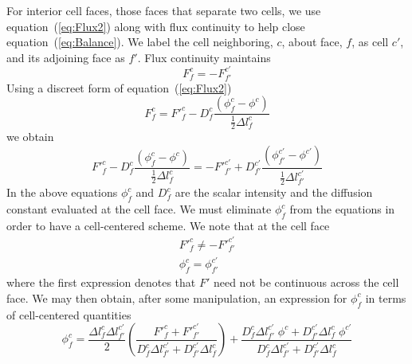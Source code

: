 \documentclass[12pt]{article}
\begin{document}
For interior cell faces, those faces that separate two cells, we use
equation~(\ref{eq:Flux2}) along with flux continuity to help close
equation~(\ref{eq:Balance}).
We label the cell neighboring, $c$, about face, $f$, as cell $c'$, and its
adjoining face as $f'$.
Flux continuity maintains
\begin{equation}
        F^{c}_{f} = - F^{c'}_{f'}
\end{equation}
Using a discreet form of equation~(\ref{eq:Flux2})
\begin{equation}
        F^{c}_{f} = 
        {F'}^{c}_{f} - D^{c}_{f} \frac{(\phi^{c}_{f} - \phi^{c})}
                                      {\frac{1}{2}\Delta l^{c}_{f}}
\label{eq:Flux3}
\end{equation}
we obtain
\begin{equation}
        {F'}^{c}_{f} - D^{c}_{f} \frac{(\phi^{c}_{f} - \phi^{c})}
                                    {\frac{1}{2}\Delta l^{c}_{f}}
    = - {F'}^{c'}_{f'} + D^{c'}_{f'} \frac{(\phi^{c'}_{f'} - \phi^{c'})}
                                        {\frac{1}{2}\Delta l^{c'}_{f'}}
\end{equation}
In the above equations $\phi^{c}_{f}$ and $D^{c}_{f}$
are the scalar intensity and the diffusion constant evaluated
at the cell face.
We must eliminate $\phi^{c}_{f}$ from the equations in order to have a
cell-centered scheme.
We note that at the cell face
\begin{gather}
        {F'}^{c}_{f} \ne - {F'}^{c'}_{f'} \\
        \phi^{c}_{f} = \phi^{c'}_{f'}
\end{gather}
where the first expression denotes that $F'$ need not be continuous across
the cell face.
We may then obtain, after some manipulation,
an expression for $\phi^{c}_{f}$ in terms of cell-centered
quantities
\begin{equation}
        \phi^{c}_{f} =  \frac{\Delta l^{c}_{f} \Delta l^{c'}_{f'}}{2}
                        \left(
                        \frac
                        {  {F'}^{c}_{f} + {F'}^{c'}_{f'}
                        }
                        { D^{c}_{f} \Delta l^{c'}_{f'}
                            + D^{c'}_{f'} \Delta l^{c}_{f}
                        }
                        \right)
                        +
                        \frac
                        { D^{c}_{f} \Delta l^{c'}_{f'} \; \phi^{c} 
                            + D^{c'}_{f'} \Delta l^{c}_{f} \; \phi^{c'} 
                        }
                        { D^{c}_{f} \Delta l^{c'}_{f'}
                            + D^{c'}_{f'} \Delta l^{c}_{f}
                        }
\label{eq:phicf}
\end{equation}
\end{document}
